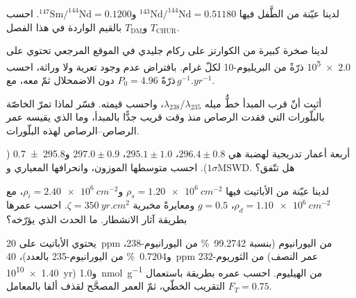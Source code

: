 \begin{exercise}[$\star$]\label{exo:b3:advanced-geochronology:3}
لدينا عيّنة من الطَّفل فيها $^{143}\mathrm{Nd}/^{144}\mathrm{Nd} = 0.51180$
و$^{147}\mathrm{Sm}/^{144}\mathrm{Nd} = 0.1200$. احسب $T_{\mathrm{CHUR}}$
و$T_{\mathrm{DM}}$ بالقيم الواردة في هذا الفصل.
\end{exercise}

\begin{exercise}[$\star$]\label{exo:b3:advanced-geochronology:4}
لدينا صخرة كبيرة من الكوارتز على ركام جليدي في الموقع المرجعي تحتوي على \num{2.0e5}
ذرّةً من البريليوم-10 لكلّ غرام. بافتراض عدم وجود تعرية ولا وراثة،
احسب  دون الاضمحلال ثمّ معه، مع $P_0 =
\num{4.96}\text{ ذرّةً}\,\unit{g^{-1}.yr^{-1}}$.
\end{exercise}

\begin{exercise}[$\star\star$]\label{exo:b3:advanced-geochronology:5}
أثبِت أنّ  قرب المبدأ خطٌّ ميله
$\lambda_{238}/\lambda_{235}$، واحسب قيمته. فسّر لماذا تمرّ 
الخاصّة بالبلّورات التي فقدت الرصاص منذ وقت قريب جدًّا بالمبدأ، وما الذي
يقيسه عمر الرصاص--الرصاص لهذه البلّورات.
\end{exercise}

\begin{exercise}[$\star\star$]\label{exo:b3:advanced-geochronology:6}
أربعة أعمار تدريجية لهضبة هي $296.4 \pm 0.8$، $295.1 \pm 1.0$، $297.0 \pm
0.9$ و\qty[separate-uncertainty=true]{295.8 \pm 0.7}{\Ma} ($1\sigma$). احسب متوسطها الموزون،
وانحرافها المعياري وMSWD. هل تتّفق؟
\end{exercise}

\begin{exercise}[$\star\star$]\label{exo:b3:advanced-geochronology:7}
لدينا عيّنة من الأباتيت فيها $\rho_s = \qty{1.20e6}{cm^{-2}}$ و$\rho_i =
\qty{2.40e6}{cm^{-2}}$، مع $\rho_d = \qty{1.10e6}{cm^{-2}}$، $g = 0.5$
ومعايرةً مخبرية $\zeta = \qty{350}{yr.cm^2}$. احسب عمرها بطريقة آثار
الانشطار. ما الحدث الذي يؤرّخه؟
\end{exercise}

\begin{exercise}[$\star\star$]\label{exo:b3:advanced-geochronology:8}
يحتوي الأباتيت على \qty{20}{ppm} من اليورانيوم (بنسبة \qty{99.2742}{\percent}
من اليورانيوم-238، و\qty{0.7204}{\percent} من اليورانيوم-235 بالعدد)، \qty{40}{ppm}
من الثوريوم-232 (عمر النصف \qty{1.40e10}{yr}) و\qty{1.0}{nmol.g^{-1}} من الهيليوم.
احسب عمره بطريقة  باستعمال التقريب الخطّي، ثمّ العمر
المصحَّح لقذف ألفا بالمعامل $F_T = 0.75$.
\end{exercise}

